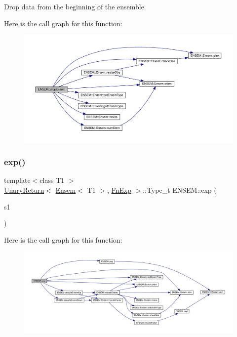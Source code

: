 Drop data from the beginning of the ensemble. 

Here is the call graph for this function\+:\nopagebreak
\begin{figure}[H]
\begin{center}
\leavevmode
\includegraphics[width=350pt]{d1/d9e/group__eensem_gae6658352073b607eb80030d2c69e5383_cgraph}
\end{center}
\end{figure}
\mbox{\label{group__eensem_ga98866485949365e5677de99a9cbe2a93}} 
\subsubsection{\texorpdfstring{exp()}{exp()}}
{\footnotesize\ttfamily template$<$class T1 $>$ \\
\mbox{\hyperlink{structENSEM_1_1UnaryReturn}{Unary\+Return}}$<$ \mbox{\hyperlink{classENSEM_1_1Ensem}{Ensem}}$<$ T1 $>$, \mbox{\hyperlink{structENSEM_1_1FnExp}{Fn\+Exp}} $>$\+::Type\+\_\+t E\+N\+S\+E\+M\+::exp (\begin{DoxyParamCaption}\item[{const \mbox{\hyperlink{classENSEM_1_1Ensem}{Ensem}}$<$ T1 $>$ \&}]{s1 }\end{DoxyParamCaption})\hspace{0.3cm}{\ttfamily [inline]}}

Here is the call graph for this function\+:\nopagebreak
\begin{figure}[H]
\begin{center}
\leavevmode
\includegraphics[width=350pt]{d1/d9e/group__eensem_ga98866485949365e5677de99a9cbe2a93_cgraph}
\end{center}
\end{figure}
\mbox{\label{group__eensem_ga6639ef2f6996bfe1d8daa6ba09d52acb}} 
